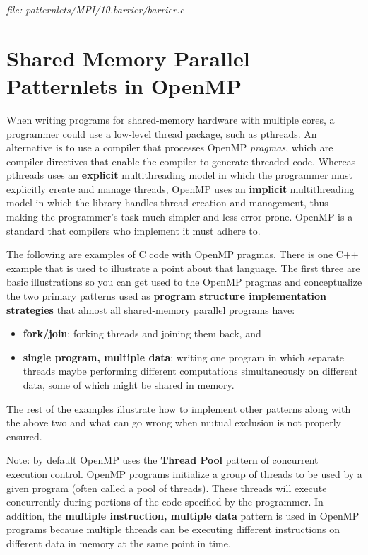 \documentclass[letterpaper,10pt,openany,oneside]{sphinxmanual}
\begin{document}
\emph{file: patternlets/MPI/10.barrier/barrier.c}


\chapter{Shared Memory Parallel Patternlets in OpenMP}
\label{SharedMemory/OpenMP_Patternlets:shared-memory-parallel-patternlets-in-openmp}\label{SharedMemory/OpenMP_Patternlets::doc}
When writing programs for shared-memory hardware with multiple cores,
a programmer could use a
low-level thread package, such as pthreads. An alternative is to use
a compiler that processes OpenMP \emph{pragmas}, which are compiler directives that
enable the compiler to generate threaded code.  Whereas pthreads uses an \textbf{explicit}
multithreading model in which the programmer must explicitly create and manage threads,
OpenMP uses an \textbf{implicit} multithreading model in which the library handles
thread creation and management, thus making the programmer's task much simpler and
less error-prone.  OpenMP is a standard that compilers who implement it must adhere to.

The following are examples of C code with OpenMP pragmas.  There is one C++
example that is used to illustrate a point about that language. The first
three are basic illustrations so you can get used to the OpenMP pragmas and
conceptualize the two primary patterns used as
\textbf{program structure implementation strategies} that almost all shared-memory
parallel programs have:
\begin{itemize}
\item {} 
\textbf{fork/join}:  forking threads and joining them back, and

\item {} 
\textbf{single program, multiple data}:  writing one program in which separate threads maybe performing different computations simultaneously on different data, some of which might be shared in memory.

\end{itemize}

The rest of the examples illustrate how to implement other patterns
along with the above two and what can go wrong when mutual exclusion
is not properly ensured.

Note: by default OpenMP uses the \textbf{Thread Pool} pattern of concurrent execution control.
OpenMP programs initialize a group of threads to be used by a given program
(often called a pool of threads).  These threads will execute concurrently
during portions of the code specified by the programmer.  In addition, the \textbf{multiple instruction, multiple data} pattern is used in OpenMP programs because multiple threads can be executing different instructions on different data in memory at the same point in time.
\end{document}
